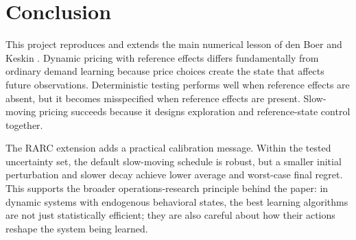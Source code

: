 \documentclass[conference]{../../LaTex_Template/IEEEtran}
\begin{document}
\section{Conclusion}
This project reproduces and extends the main numerical lesson of den Boer and Keskin \cite{denBoerKeskin2022}. Dynamic pricing with reference effects differs fundamentally from ordinary demand learning because price choices create the state that affects future observations. Deterministic testing performs well when reference effects are absent, but it becomes misspecified when reference effects are present. Slow-moving pricing succeeds because it designs exploration and reference-state control together.

The RARC extension adds a practical calibration message. Within the tested uncertainty set, the default slow-moving schedule is robust, but a smaller initial perturbation and slower decay achieve lower average and worst-case final regret. This supports the broader operations-research principle behind the paper: in dynamic systems with endogenous behavioral states, the best learning algorithms are not just statistically efficient; they are also careful about how their actions reshape the system being learned.



\end{document}

